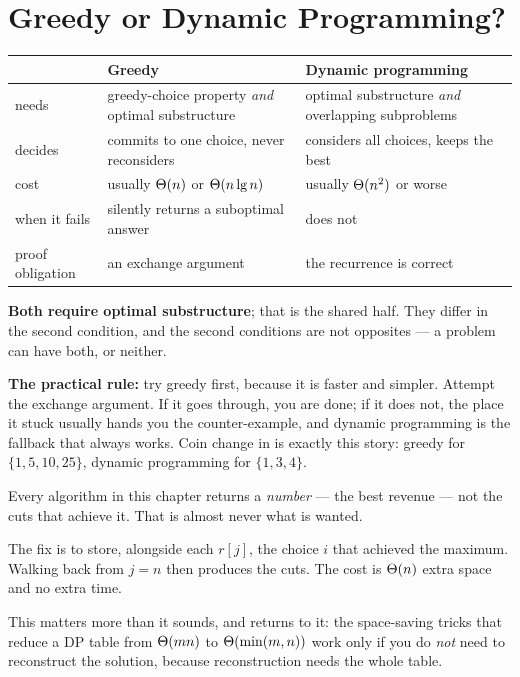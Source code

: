 \section{Greedy or Dynamic Programming?}

\begin{conceptbox}
\begin{longtable}{@{}L{3.4cm}L{5.0cm}L{5.6cm}@{}}
\toprule
{}
& \textbf{Greedy} & \textbf{Dynamic programming} \\
\midrule
\endhead
needs & greedy-choice property \emph{and} optimal substructure & optimal
  substructure \emph{and} overlapping subproblems \\
decides & commits to one choice, never reconsiders & considers all choices,
  keeps the best \\
cost & usually $\Theta(n)$ or $\Theta(n\operatorname{lg} n)$ & usually
  $\Theta(n^{2})$ or worse \\
when it fails & silently returns a suboptimal answer & does not \\
proof obligation & an exchange argument & the recurrence is correct \\
\bottomrule
\end{longtable}

\smallskip
\textbf{Both require optimal substructure}; that is the shared half. They
differ in the second condition, and the second conditions are not opposites ---
a problem can have both, or neither.

\smallskip
\textbf{The practical rule:} try greedy first, because it is faster and
simpler. Attempt the exchange argument. If it goes through, you are done; if it
does not, the place it stuck usually hands you the counter-example, and dynamic
programming is the fallback that always works. Coin change in  is
exactly this story: greedy for $\{1,5,10,25\}$, dynamic programming for
$\{1,3,4\}$.
\end{conceptbox}

\begin{alertbox}
Every algorithm in this chapter returns a \emph{number} --- the best revenue
--- not the cuts that achieve it. That is almost never what is wanted.

\smallskip
The fix is to store, alongside each $r[j]$, the choice $i$ that achieved the
maximum. Walking back from $j = n$ then produces the cuts. The cost is
$\Theta(n)$ extra space and no extra time.

\smallskip
This matters more than it sounds, and  returns to it: the
space-saving tricks that reduce a DP table from $\Theta(mn)$ to
$\Theta(\min(m,n))$ work only if you do \emph{not} need to reconstruct the
solution, because reconstruction needs the whole table.
\end{alertbox}

